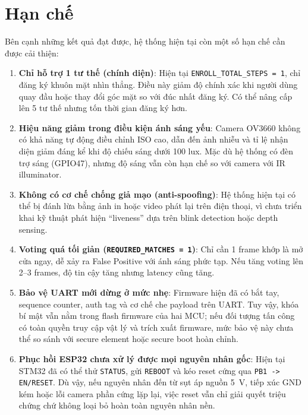 \section{Hạn chế}
\label{sec:limitations}

Bên cạnh những kết quả đạt được, hệ thống hiện tại còn một số hạn chế cần được cải thiện:

\begin{enumerate}[label=\arabic*.]
  \item \textbf{Chỉ hỗ trợ 1 tư thế (chính diện)}: Hiện tại \texttt{ENROLL\_TOTAL\_STEPS = 1}, chỉ đăng ký khuôn mặt nhìn thẳng. Điều này giảm độ chính xác khi người dùng quay đầu hoặc thay đổi góc mặt so với đúc nhất đăng ký. Có thể nâng cấp lên 5 tư thế nhưng tốn thời gian đăng ký hơn.
  
  \item \textbf{Hiệu năng giảm trong điều kiện ánh sáng yếu}: Camera OV3660 không có khả năng tự động điều chỉnh ISO cao, dẫn đến ảnh nhiễu và tỉ lệ nhận diện giảm đáng kể khi độ chiếu sáng dưới 100 lux. Mặc dù hệ thống có đèn trợ sáng (GPIO47), nhưng độ sáng vẫn còn hạn chế so với camera với IR illuminator.
  
  \item \textbf{Không có cơ chế chống giả mạo (anti-spoofing)}: Hệ thống hiện tại có thể bị đánh lừa bằng ảnh in hoặc video phát lại trên điện thoại, vì chưa triển khai kỹ thuật phát hiện ``liveness'' dựa trên blink detection hoặc depth sensing.
  
  \item \textbf{Voting quá tối giản (\texttt{REQUIRED\_MATCHES = 1})}: Chỉ cần 1 frame khớp là mở cửa ngay, dễ xảy ra False Positive với ánh sáng phức tạp. Nếu tăng voting lên 2--3 frames, độ tin cậy tăng nhưng latency cũng tăng.
  
  \item \textbf{Bảo vệ UART mới dừng ở mức nhẹ}: Firmware hiện đã có bắt tay, sequence counter, auth tag và cơ chế che payload trên UART. Tuy vậy, khóa bí mật vẫn nằm trong flash firmware của hai MCU; nếu đối tượng tấn công có toàn quyền truy cập vật lý và trích xuất firmware, mức bảo vệ này chưa thể so sánh với secure element hoặc secure boot hoàn chỉnh.
  
  \item \textbf{Phục hồi ESP32 chưa xử lý được mọi nguyên nhân gốc}: Hiện tại STM32 đã có thể thử \texttt{STATUS}, gửi \texttt{REBOOT} và kéo reset cứng qua \texttt{PB1 -> EN/RESET}. Dù vậy, nếu nguyên nhân đến từ sụt áp nguồn 5~V, tiếp xúc GND kém hoặc lỗi camera phần cứng lặp lại, việc reset vẫn chỉ giải quyết triệu chứng chứ không loại bỏ hoàn toàn nguyên nhân nền.


\end{enumerate}
